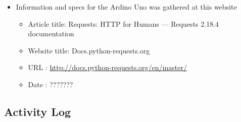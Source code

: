 \documentclass{article}
\begin{document}
\begin{thebibliography}{56}
    \begin{itemize}
        \item Information and specs for the Ardino Uno was gathered at this website
        \begin{itemize}
            \item Article title: Requests: HTTP for Humans — Requests 2.18.4 documentation
            \item Website title: Docs.python-requests.org
            \item URL          : \url{http://docs.python-requests.org/en/master/}
            \item Date         : ???????
        \end{itemize}
    \end{itemize}
\end{thebibliography}

\subsection{Activity Log}
\end{document}
